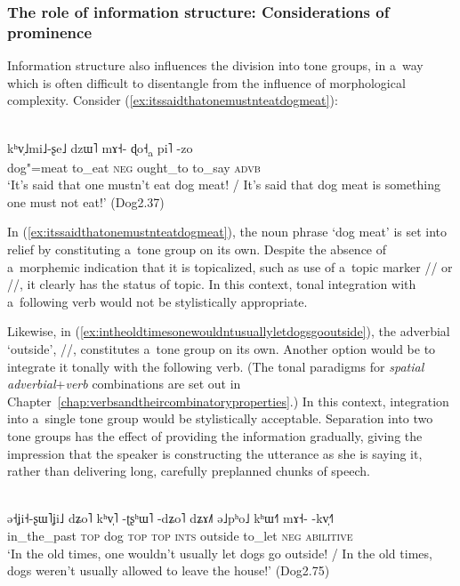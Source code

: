 \subsubsection{The role of information structure: Considerations of prominence}
\label{sec:theroleofinformationstructureconsiderationsofprominence}


Information structure also influences the division into tone groups, in a~way which is often difficult to disentangle from the influence of morphological complexity. Consider (\ref{ex:itssaidthatonemustnteatdogmeat}): 
\begin{exe}
  \ex
  \label{ex:itssaidthatonemustnteatdogmeat}
  \\
  \gll kʰv̩˩mi˩-ʂe˩	dzɯ˥	mɤ˧-	ɖo˧\textsubscript{a}		pi˥	-zo\\
  dog"=meat	to\_eat	\textsc{neg}	ought\_to	to\_say	\textsc{advb}\\
  \glt ‘It’s said that one mustn’t eat dog meat! / It’s said that dog meat is something one must not
  eat!’ (Dog2.37)
\end{exe}

In (\ref{ex:itssaidthatonemustnteatdogmeat}), the noun phrase ‘dog meat’ is set into relief by
constituting a~tone group on its own. Despite the absence of a~morphemic indication that it is
topicalized, such as use of a~topic marker // or //, it clearly has the
status of topic. In this context, tonal integration with a~following verb would not be stylistically
appropriate.

Likewise, in (\ref{ex:intheoldtimesonewouldntusuallyletdogsgooutside}), the {adverbial} ‘outside’,
//, constitutes a~tone group on its own. Another option would be to integrate it tonally
with the following verb. (The tonal paradigms for \textit{spatial adverbial}+\textit{verb} combinations
are set out in Chapter~\ref{chap:verbsandtheircombinatoryproperties}.) In this context, integration into a~single tone group would be
stylistically acceptable. Separation
into two tone groups has the effect of providing the information gradually, giving the impression
that the speaker is constructing the utterance as she is saying it, rather than delivering long, carefully
preplanned chunks of speech.

\begin{exe}
  \ex
  \label{ex:intheoldtimesonewouldntusuallyletdogsgooutside}
  \\
  \gll ə˧ʝi˧-ʂɯ˥ʝi˩	dʑo˥	kʰv̩˥	-ʈʂʰɯ˥	-dʑo˥	dʑɤ˩˥		ə˩pʰo˩ kʰɯ˧˥	mɤ˧-	-kv̩˧˥\\
  in\_the\_past	\textsc{top}	dog	\textsc{top}	\textsc{top}	\textsc{ints}	outside
  to\_let	\textsc{neg}	\textsc{abilitive}\\
  \glt ‘In the old times, one wouldn’t usually let dogs go outside! / In the old times, dogs weren’t usually allowed to leave the house!’ (Dog2.75)
\end{exe}

